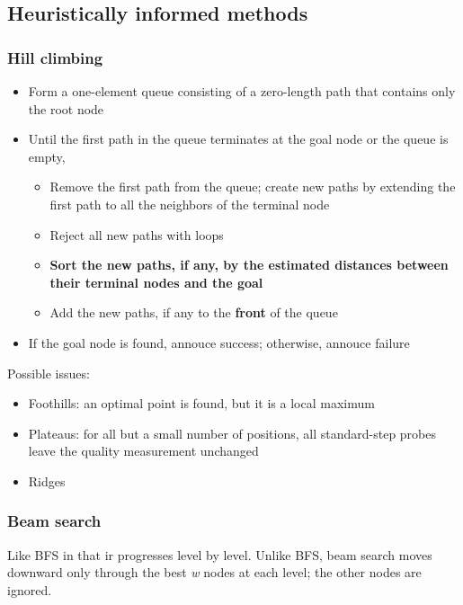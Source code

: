 \subsection{Heuristically informed methods}

\subsubsection{Hill climbing}

\begin{itemize}
  \item Form a one-element queue consisting of a zero-length path
    that contains only the root node
  \item Until the first path in the queue terminates at the goal node 
    or the queue is empty,
    \begin{itemize}
      \item Remove the first path from the queue; create new paths
        by extending the first path to all the neighbors of the 
        terminal node
      \item Reject all new paths with loops
      \item \textbf{Sort the new paths, if any, by the estimated distances 
        between their terminal nodes and the goal}
      \item Add the new paths, if any to the \textbf{front} of the queue
    \end{itemize}
  \item If the goal node is found, annouce success; otherwise, annouce 
    failure
\end{itemize}

Possible issues:
\begin{itemize}
  \item Foothills: an optimal point is found, but it is a local maximum
  \item Plateaus: for all but a small number of positions, all standard-step
    probes leave the quality measurement unchanged
  \item Ridges
\end{itemize}

\subsubsection{Beam search}

Like BFS in that ir progresses level by level. Unlike BFS, beam 
search moves downward only through the best \textit{w} 
nodes at each level; the other nodes are ignored.

